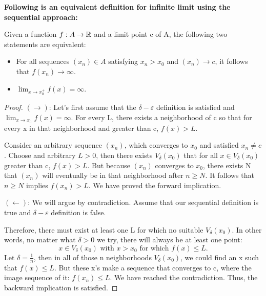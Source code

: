 \begin{numedquestion}

\textbf{Following is an equivalent definition for infinite limit using the sequential approach:} 
\begin{defi}
  Given a function $f: A \rightarrow \mathbb{R} $ and a limit point c of A, the following two statements are equivalent: 
  \begin{itemize}
    \item For all sequences $(x_n) \in A$ satisfying $x_n > x_0$ and $(x_n) \rightarrow c$, it follows that $f(x_n) \rightarrow \infty$.
    \item $\lim_{x \rightarrow x_0^+}f(x) = \infty$.
  \end{itemize} 
\end{defi} 


\begin{proof} 
$(\rightarrow) $: Let's first assume that the $\delta - \varepsilon$ definition is satisfied and $\lim_{x\rightarrow x_0}{f(x)} = \infty$. For every L, there exists a neighborhood of c so that for every x in that neighborhood and greater than c, $f(x) > L$. 

Consider an arbitrary sequence $(x_n)$, which converges to $x_0$ and satisfied $x_n \neq c$.  Choose and arbitrary $L > 0$, then there exists $V_{\delta}(x_0)$ that for all $x \in V_{\delta}(x_0)$ greater than c, $f(x) > L$. But because $(x_n)$ converges to $x_0$, there exists N that $(x_n)$ will eventually be in that neighborhood after $n \geq N$. It follows that $n \geq N$ implies $f(x_n) > L$. We have proved the forward implication. \newline


\hspace{0.25in}$(\leftarrow)$: We will argue by contradiction. Assume that our sequential definition is true and $\delta - \varepsilon$ definition is false. 

Therefore, there must exist at least one L for which no suitable $V_{\delta}(x_0)$. In other words, no matter what $\delta > 0 $ we try, there will always be at least one point: 
\[ x \in V_{\delta}(x_0) \text  {    with    } x > x_0 \text{    for which    } f(x) \leq L.\]
Let $\delta = \frac{1}{n}$, then in all of those n neighborhoods $V_{\delta}(x_0)$, we could find an x such that $f(x) \leq L$. But these x's make a sequence that converges to c, where the image sequence of it: $f(x_n) \leq L$. We have reached the contradiction. Thus, the backward implication is satisfied.
\end{proof}
\end{numedquestion}

